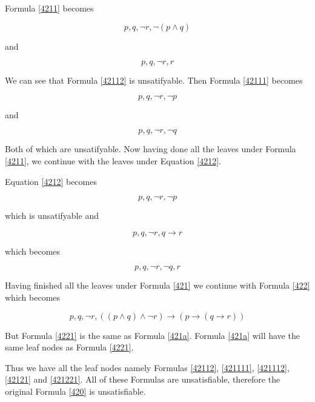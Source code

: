 \documentclass[10pt,a4paper]{article}
\begin{document}
Formula \ref{4211} becomes 


\begin{equation}
\label{42111}
p, q, \neg r, \neg ( p \wedge q)
\end{equation}

and 

\begin{equation}
\label{42112}
p, q, \neg r, r
\end{equation}

We can see that Formula \ref{42112} is unsatifyable.  Then Formula \ref{42111} becomes

\begin{equation}
\label{421111}
p, q, \neg r, \neg p 
\end{equation}

and 

\begin{equation}
\label{421112}
p, q, \neg r, \neg q 
\end{equation}

Both of which are unsatifyable. Now having done all the leaves under Formula \ref{4211}, we continue with the leaves under Equation \ref{4212}.

Equation \ref{4212} becomes

\begin{equation}
\label{42121}
p, q, \neg r, \neg p 
\end{equation}

which is unsatifyable and
 
\begin{equation}
\label{42122}
p, q, \neg r, q \rightarrow r 
\end{equation} 

which becomes

\begin{equation}
\label{421221}
p, q, \neg r, \neg q,  r 
\end{equation} 
 
Having finished all the leaves under Formula \ref{421} we continue with Formula \ref{422} which becomes

\begin{equation}
\label{4221}
 p, q, \neg r,  (( p \wedge q) \wedge \neg r) \rightarrow (p \rightarrow ( q \rightarrow r )) 
\end{equation} 

But Formula \ref{4221} is the same as Formula \ref{421a}. Formula \ref{421a} will have the same leaf nodes as Formula \ref{4221}.

Thus we have all the leaf nodes namely Formulas \ref{42112}, \ref{421111}, \ref{421112}, \ref{42121} and \ref{421221}. All of these Formulas are unsatisfiable, 
therefore the original Formula \ref{420} is unsatisfiable.
\end{document}
